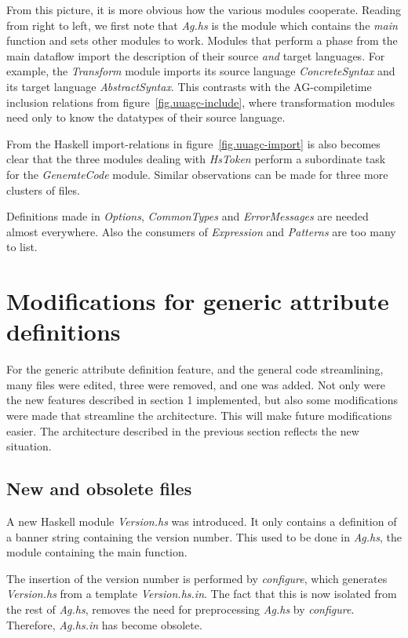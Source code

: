 \documentclass[twoside]{article}
\begin{document}
From this picture, it is more obvious how the various modules cooperate.
Reading from right to left, we first note that {\em Ag.hs} is the module
which contains the {\em main} function and sets other modules to work.
Modules that perform a phase from the main dataflow import
the description of their source {\em and} target languages.
For example, the {\em Transform} module imports
its source language {\em ConcreteSyntax} and its target language {\em AbstractSyntax}.
This contrasts with the AG-compiletime inclusion relations from figure~\ref{fig.uuagc-include},
where transformation modules need only to know the datatypes of their source language.

From the Haskell import-relations in figure~\ref{fig.uuagc-import} is also becomes clear
that the three modules dealing with {\em HsToken} perform a subordinate task for
the {\em GenerateCode} module.
Similar observations can be made for three more clusters of files.

Definitions made in {\em Options}, {\em CommonTypes} and {\em ErrorMessages}
are needed almost everywhere. Also the consumers of {\em Expression} and {\em Patterns}
are too many to list.


\newpage
\section{Modifications for generic attribute definitions}

For the generic attribute definition feature, and the general code streamlining,
many files were edited, three were removed, and one was added.
Not only were the new features described in section 1 implemented,
but also some modifications were made that streamline the architecture.
This will make future modifications easier.
The architecture described in the previous section reflects the new situation.

\subsection{New and obsolete files}

A new Haskell module {\em Version.hs} was introduced.
It only contains a definition of a banner string containing the version number.
This used to be done in {\em Ag.hs}, the module containing the main function.

The insertion of the version number is performed by {\em configure},
which generates {\em Version.hs} from a template {\em Version.hs.in}.
The fact that this is now isolated from the rest of {\em Ag.hs},
removes the need for preprocessing {\em Ag.hs} by {\em configure}.
Therefore, {\em Ag.hs.in} has become obsolete.
\end{document}
